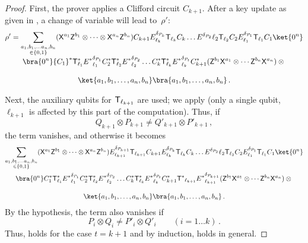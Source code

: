 \documentclass{toc}
\newcommand{\tgate}{{\sf T}}
\newcommand{\xgate}{{\sf X}}
\newcommand{\zgate}{{\sf Z}}
\newcommand{\ketbra}[2]{\ket{#1}\bra{#2}}			%
\newcommand{\egoketbra}[1]{\ketbra{#1}{#1}}			%
\begin{document}
\begin{proof}
First, the prover applies a Clifford circuit $C_{k+1}$. After a key update as given in , a change of variable will lead to~$\rho'$:
%
\begin{multline}
\rho' = \sum_{\substack{a_1,b_1, \ldots a_n, b_n \\ \in \{0,1\}}} (\xgate^{a_1}\zgate^{b_1} \otimes \cdots \otimes \xgate^{a_n}\zgate^{b_n}) {C_{k+1}} E^{\delta_{P_k}}_{\ell_k}    \tgate_{\ell_k} C_k \ldots  E^{\delta_{P_2}}{\ell_2}    \tgate_{\ell_2} C_2  E^{\delta_{P_1}}_{\ell_1}  \tgate_{\ell_1} C_1 \ket{0^n}\\[-1ex]
 \bra{0^n} {C_1}^* \tgate^*_{\ell_1}   {E^*}^{\delta_{P_1}}_{\ell_1} C_2^*   \tgate^*_{\ell_2}   {E^*}^{\delta_{P_2}}_{\ell_2} \ldots   C_k^* \tgate^*_{\ell_k}   {E^*}^{\delta_{P_t}}_{\ell_k} C_{k+1}^* (\zgate^{b_1} \xgate^{a_1}\otimes \cdots \zgate^{b_n} \xgate^{a_n})
 \otimes {}\\[2ex]
 \egoketbra{a_1, b_1, \ldots ,a_n, b_n}\,.
\end{multline}

Next, the auxiliary qubits for  $\tgate_{\ell_{k+1}}$ are used; we apply  (only a single qubit, $\ell_{k+1}$ is affected by this part of the computation). Thus, if
\begin{equation}
  Q_{k+1} \otimes P_{k+1} \neq Q'_{k+1} \otimes P'_{k+1}\,,
\end{equation}
the term vanishes, and otherwise it becomes%
\begin{multline}
\sum_{\substack{a_1,b_1, \ldots a_n, b_n \\ \in \{0,1\}}} (\xgate^{a_1}\zgate^{b_1} \otimes \cdots \otimes \xgate^{a_n}\zgate^{b_n})  E^{\delta_{P_{k+1}}}_{\ell_{k+1}}    \tgate_{\ell_{k+1}} {C_{k+1}} E^{\delta_{P_k}}_{\ell_k}    \tgate_{\ell_k} C_k \ldots  E^{\delta_{P_2}}{\ell_2}    \tgate_{\ell_2} C_2  E^{\delta_{P_1}}_{\ell_1}  \tgate_{\ell_1} C_1 \ket{0^n}\\
 \bra{0^n} C_1^* \tgate^*_{\ell_1}   {E^*}^{\delta_{P_1}}_{\ell_1} C_2^*   \tgate^*_{\ell_2}   {E^*}^{\delta_{P_2}}_{\ell_2} \ldots   C_k^* \tgate^*_{\ell_k}   {E^*}^{\delta_{P_t}}_{\ell_k} C_{k+1}^*  {\tgate^*}_{\ell_{k+1}}  {E^*}^{\delta_{P_{k+1}}}_{\ell_{k+1}}
  (\zgate^{b_1} \xgate^{a_1}\otimes \cdots \zgate^{b_n} \xgate^{a_n})
 \otimes {}\\[2ex]
 \egoketbra{a_1, b_1, \ldots ,a_n, b_n}\,.
\end{multline}
By the hypothesis, the term also vanishes if
\begin{equation}
  P_i\otimes Q_i \neq P'_i \otimes Q'_i\qquad (i=1\ldots k)\,.
\end{equation}
Thus,  holds for
the case $t= k+1$ and by induction,
 holds in general.
\end{proof}
\end{document}
